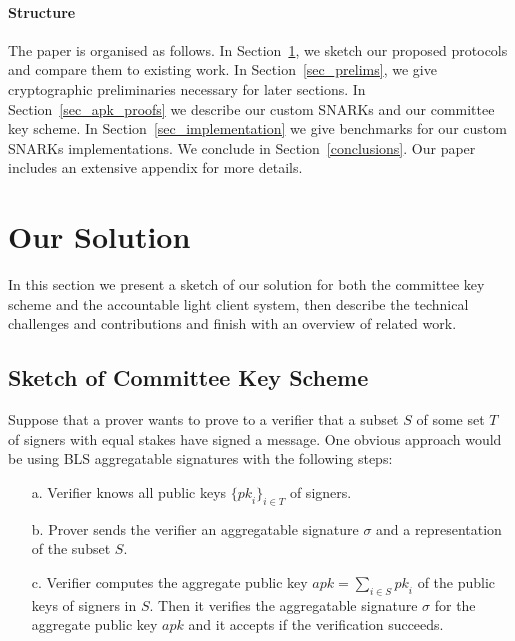 \paragraph{Structure} The paper is organised as follows. 
In Section~\ref{sec:sketch}, we sketch our proposed protocols and compare 
them to existing work. In Section~\ref{sec_prelims}, we give cryptographic 
preliminaries necessary for later sections. In Section~\ref{sec_apk_proofs}
we describe our custom SNARKs and our committee key scheme. In 
Section~\ref{sec_implementation} we give benchmarks for our custom SNARKs 
implementations. We conclude in Section~\ref{conclusions}. Our paper includes 
an extensive appendix for more details.%
\vspace{-0.25cm}
\section{Our Solution} 
\label{sec:sketch}
\vspace{-0.2cm}

In this section we present a sketch of our solution for both the committee key scheme and the accountable light client system, 
then describe the technical challenges and contributions and finish with an overview of related work.

\vspace{-0.3cm}
\subsection{Sketch of Committee Key Scheme}
\label{sec:lcsketch}
\vspace{-0.1cm}

\noindent Suppose that a prover wants to prove to a verifier that a subset $S$ of some set $T$ of signers {\color{red} with equal stakes} have signed a message. 
One obvious approach would be using BLS aggregatable signatures with the following steps:

\begin{itemize}
\item[a.] Verifier knows all public keys $\{\mathit{pk}_i\}_{i \in T}$ of signers.%

\item[b.] Prover sends the verifier an aggregatable signature $\sigma$ and a representation of the subset $S$.

\item[c.] Verifier computes the aggregate public key $\mathit{apk}=\sum_{i \in S} \mathit{pk}_i$ of the public keys of signers in $S$. 
Then it verifies the aggregatable signature $\sigma$ for the aggregate public key $\mathit{apk}$ and it accepts if the verification succeeds.
\end{itemize}

